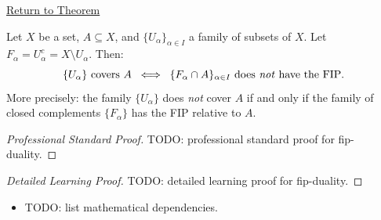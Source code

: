 \newpage
{}
\label{prf:fip-duality}

\begin{remark*}[Return]
\hyperref[prop:fip-duality]{Return to Theorem}
\end{remark*}

\begin{proposition*}
Let $X$ be a set, $A \subseteq X$, and $\{U_\alpha\}_{\alpha \in I}$ a
family of subsets of $X$. Let $F_\alpha = U_\alpha^c = X \setminus U_\alpha$.
Then:
\[
\{U_\alpha\} \text{ covers } A
\;\;\Longleftrightarrow\;\;
\{F_\alpha \cap A\}_{\alpha \in I} \text{ does \emph{not} have the FIP}.
\]
More precisely: the family $\{U_\alpha\}$ does \emph{not} cover $A$ if and
only if the family of closed complements $\{F_\alpha\}$ has the FIP relative
to $A$.
\end{proposition*}

\begin{proof}[Professional Standard Proof]
\LRAProofBodyStart
TODO: professional standard proof for fip-duality.
\end{proof}

\begin{proof}[Detailed Learning Proof]
\LRAProofBodyStart
TODO: detailed learning proof for fip-duality.
\end{proof}

\begin{remark*}
\end{remark*}

\begin{dependencies}
\begin{itemize}
  \item TODO: list mathematical dependencies.
\end{itemize}
\end{dependencies}

\clearpage
